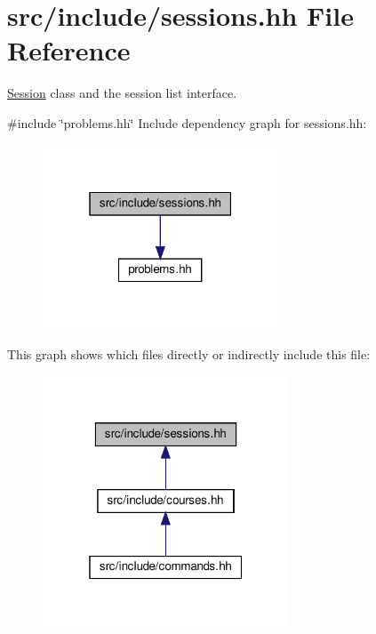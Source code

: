 \hypertarget{sessions_8hh}{}\section{src/include/sessions.hh File Reference}
\label{sessions_8hh}


\hyperlink{classSession}{Session} class and the session list interface.  


{\ttfamily \#include \char`\"{}problems.\+hh\char`\"{}}\newline
Include dependency graph for sessions.\+hh\+:
\nopagebreak
\begin{figure}[H]
\begin{center}
\leavevmode
\includegraphics[width=199pt]{sessions_8hh__incl}
\end{center}
\end{figure}
This graph shows which files directly or indirectly include this file\+:
\nopagebreak
\begin{figure}[H]
\begin{center}
\leavevmode
\includegraphics[width=208pt]{sessions_8hh__dep__incl}
\end{center}
\end{figure}
